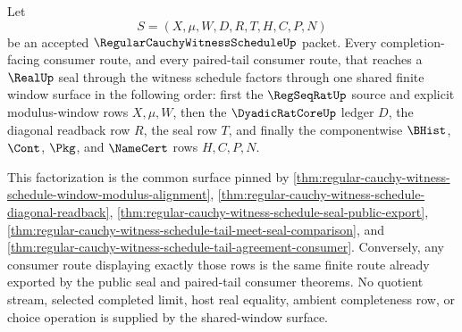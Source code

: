 \begin{theorem}
\label{thm:regular-cauchy-witness-schedule-shared-window-factorization}
Let
$$
S=(X,\mu,W,D,R,T,H,C,P,N)
$$
be an accepted $\RegularCauchyWitnessScheduleUp$ packet. Every completion-facing consumer route, and every paired-tail consumer route, that reaches a $\RealUp$ seal through the witness schedule factors through one shared finite window surface in the following order: first the $\RegSeqRatUp$ source and explicit modulus-window rows $X,\mu,W$, then the $\DyadicRatCoreUp$ ledger $D$, the diagonal readback row $R$, the seal row $T$, and finally the componentwise $\BHist$, $\Cont$, $\Pkg$, and $\NameCert$ rows $H,C,P,N$.

This factorization is the common surface pinned by \autoref{thm:regular-cauchy-witness-schedule-window-modulus-alignment}, \autoref{thm:regular-cauchy-witness-schedule-diagonal-readback}, \autoref{thm:regular-cauchy-witness-schedule-seal-public-export}, \autoref{thm:regular-cauchy-witness-schedule-tail-meet-seal-comparison}, and \autoref{thm:regular-cauchy-witness-schedule-tail-agreement-consumer}. Conversely, any consumer route displaying exactly those rows is the same finite route already exported by the public seal and paired-tail consumer theorems. No quotient stream, selected completed limit, host real equality, ambient completeness row, or choice operation is supplied by the shared-window surface.
\end{theorem}

